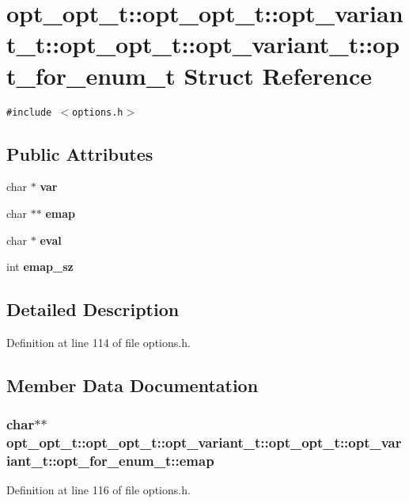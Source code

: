 \section{opt\_\-opt\_\-t::opt\_\-opt\_\-t::opt\_\-variant\_\-t::opt\_\-opt\_\-t::opt\_\-variant\_\-t::opt\_\-for\_\-enum\_\-t Struct Reference}
\label{structopt__opt__t_1_1opt__variant__t_1_1opt__for__enum__t}
{\tt \#include $<$options.h$>$}

\subsection*{Public Attributes}
\begin{CompactItemize}
\item 
char $\ast$ {\bf var}
\item 
char $\ast$$\ast$ {\bf emap}
\item 
char $\ast$ {\bf eval}
\item 
int {\bf emap\_\-sz}
\end{CompactItemize}


\subsection{Detailed Description}


Definition at line 114 of file options.h.

\subsection{Member Data Documentation}
\subsubsection[{emap}]{\setlength{\rightskip}{0pt plus 5cm}char$\ast$$\ast$ opt\_\-opt\_\-t::opt\_\-opt\_\-t::opt\_\-variant\_\-t::opt\_\-opt\_\-t::opt\_\-variant\_\-t::opt\_\-for\_\-enum\_\-t::emap}\label{structopt__opt__t_1_1opt__variant__t_1_1opt__for__enum__t_2f451aff2bfca2e6cf19826fbf3e283d}




Definition at line 116 of file options.h.
